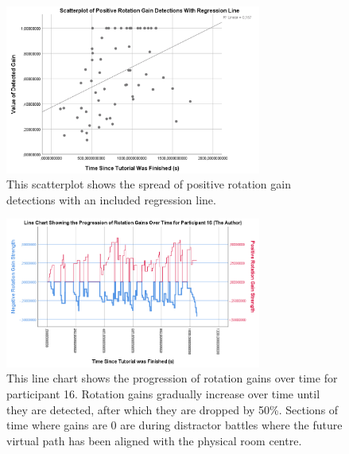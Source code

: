 \begin{figure}[tbph]
    \centering
    \includegraphics[width=0.75\textwidth]{figures/graphs/PosRotDetectionsRegLine.png}
    \caption[Scatterplot For Positive  Rotation Gain Detections Including Regression Line]{This scatterplot shows the spread of positive rotation gain detections with an included regression line.}
    \label{fig:posRotRegLine}
\end{figure}

\begin{figure}[tbph]
    \centering
    \includegraphics[width=0.75\textwidth]{figures/graphs/rotationGainProgressionAuthor.png}
    \caption[Line Chart Showing the Progression of Rotation Gains for Participant 16]{This line chart shows the progression of rotation gains over time for participant 16. Rotation gains gradually increase over time until they are detected, after which they are dropped by 50\%. Sections of time where gains are 0 are during distractor battles where the future virtual path has been aligned with the physical room centre.}
    \label{fig:authorRotationProgression}
\end{figure}


